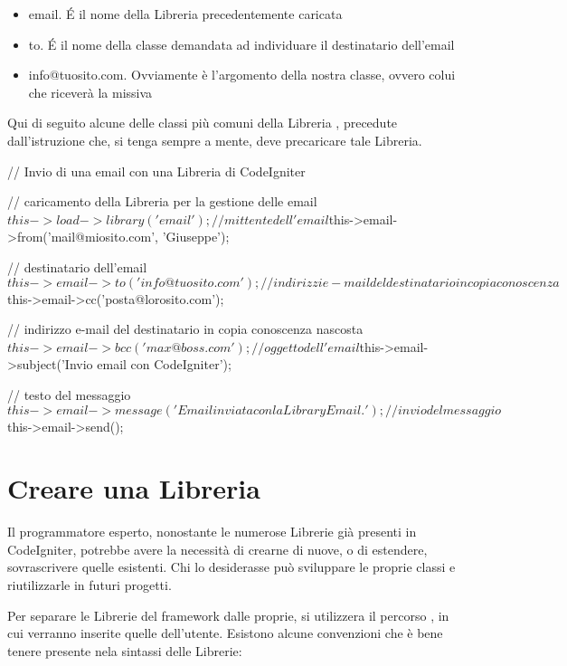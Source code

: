 
\begin{itemize}
\item email. \'E il nome della Libreria precedentemente caricata
\item to. \'E il nome della classe demandata ad individuare il destinatario dell'email
\item info@tuosito.com. Ovviamente è l'argomento della nostra classe, ovvero colui che riceverà la missiva
\end{itemize}

Qui di seguito alcune delle classi più comuni della Libreria , precedute dall'istruzione che, si tenga sempre a mente, deve precaricare tale Libreria.

\begin{code}
// Invio di una email con una Libreria di CodeIgniter

// caricamento della Libreria per la gestione delle email
$this->load->library('email');

// mittente dell'email
$this->email->from('mail@miosito.com', 'Giuseppe');

// destinatario dell'email
$this->email->to('info@tuosito.com');

// indirizzi e-mail del destinatario in copia conoscenza
$this->email->cc('posta@lorosito.com');

// indirizzo e-mail del destinatario in copia conoscenza nascosta
$this->email->bcc('max@boss.com');

// oggetto dell'email
$this->email->subject('Invio email con CodeIgniter');

// testo del messaggio
$this->email->message('Email inviata con la Library Email.');

// invio del messaggio
$this->email->send();
\end{code}

\section{Creare una Libreria}
Il programmatore esperto, nonostante le numerose Librerie già presenti in CodeIgniter, potrebbe avere la necessità di crearne di nuove, o di estendere, sovrascrivere quelle esistenti. Chi lo desiderasse può sviluppare le proprie classi e riutilizzarle in futuri progetti.

Per separare le Librerie del framework dalle proprie, si utilizzera il percorso , in cui verranno inserite quelle dell'utente. Esistono alcune convenzioni che è bene tenere presente nela sintassi delle Librerie:

